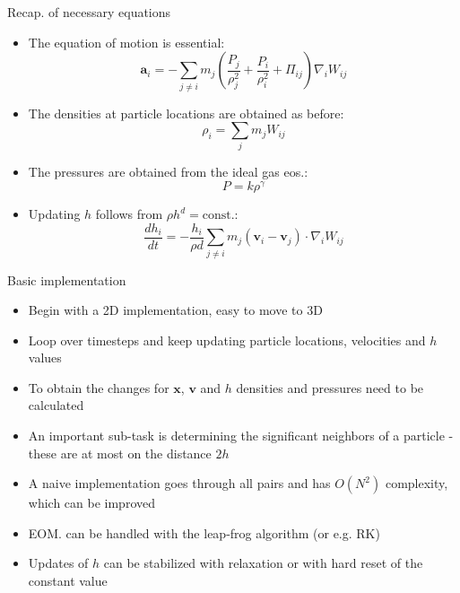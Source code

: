 \documentclass{beamer}
\begin{document}
\begin{frame}{Recap. of necessary equations}
\begin{itemize}

\item The equation of motion is essential:
\begin{equation}
 \mathbf{a}_i = -\sum_{j \neq i} m_j \left( \frac{P_j}{\rho_j^2} + \frac{P_i}{\rho_i^2} + \Pi_{ij} \right) \nabla_i W_{ij} 
\end{equation}
\item The densities at particle locations are obtained as before:
\begin{equation}
\rho_i = \sum_j m_j W_{ij}
\end{equation}
\item The pressures are obtained from the ideal gas eos.:
\begin{equation}
 P = k \rho^\gamma
\end{equation}
\item Updating $h$ follows from $\rho h^d = \text{const.}$:
\begin{equation}
 \frac{d h_i}{dt} = -\frac{h_i}{\rho d} \sum_{j \neq i} m_j ( \mathbf{v}_i - \mathbf{v}_j ) \cdot \nabla_i W_{ij}
\end{equation}

\end{itemize}
\end{frame}

\begin{frame}{Basic implementation}
\begin{itemize}

\item Begin with a 2D implementation, easy to move to 3D
\item Loop over timesteps and keep updating particle locations, velocities and $h$ values
\item To obtain the changes for $\mathbf{x}$, $\mathbf{v}$ and $h$ densities and pressures need to be calculated
\item An important sub-task is determining the significant neighbors of a particle - these are at most on the distance $2h$
\item A naive implementation goes through all pairs and has $O(N^2)$ complexity, which can be improved
\item EOM. can be handled with the leap-frog algorithm (or e.g. RK)
\item Updates of $h$ can be stabilized with relaxation or with hard reset of the constant value

\end{itemize}
\end{frame}
\end{document}
